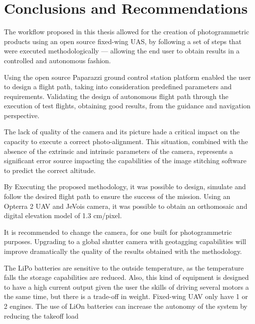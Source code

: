 \section{Conclusions and Recommendations}
The workflow proposed in this thesis allowed for the creation of photogrammetric products using an open source fixed-wing UAS, by following a set of steps that were executed methodologically — allowing the end user to obtain results in a controlled and autonomous fashion.

Using the open source Paparazzi ground control station platform enabled the user to design a flight path, taking into consideration predefined parameters and requirements. Validating the design of autonomous flight path through the execution of test flights, obtaining good results, from the guidance and navigation perspective.

The lack of quality of the camera and its picture hade a critical impact on the capacity to execute a correct photo-alignment. This situation, combined with the absence of the extrinsic and intrinsic parameters of the camera, represents a significant error source impacting the capabilities of the image stitching software to predict the correct altitude.

 By  Executing the proposed methodology, it was possible to design, simulate and follow the desired flight path to ensure the success of the mission.  Using an Opterra 2 UAV and JeVois camera, it was possible to obtain an orthomosaic and digital elevation model of 1.3 cm/pixel.
 

It is recommended to change the camera, for one built for photogrammetric purposes. Upgrading to a global shutter camera with geotagging capabilities will improve dramatically the quality of the results obtained with the methodology.

The LiPo batteries are sensitive to the outside temperature, as the temperature falls the storage capabilities are reduced. Also, this kind of equipment is designed to have a high current output given the user the skills of driving several motors a the same time, but there is a trade-off in weight. Fixed-wing UAV only have 1 or 2 engines. The use of LiOn batteries can increase the autonomy of the system by reducing the takeoff load